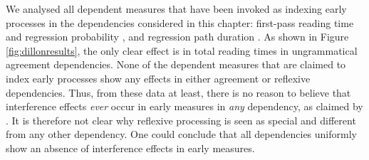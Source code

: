 \documentclass{cambridge7A}\usepackage[]{graphicx}\usepackage[]{color}
\begin{document}
We analysed all dependent measures that have been invoked as indexing  early processes in the dependencies considered in this chapter: first-pass reading time and regression probability \citep{DillonMishlerSloggett2013}, and regression path duration \citep{CunningsSturt2018}. As shown in Figure \ref{fig:dillonresults}, the only clear effect is in total reading times in ungrammatical agreement dependencies. None of the dependent measures that are claimed to index early processes show any effects in either agreement or reflexive dependencies. 
Thus, from these data at least, there is no reason to believe that interference effects \textit{ever} occur in early measures in \textit{any} dependency, as claimed by \cite{Sturt2003}. It is therefore not clear why reflexive processing is seen as special and different from any other dependency. One could conclude that all dependencies uniformly show an absence of interference effects in early measures.
\end{document}
